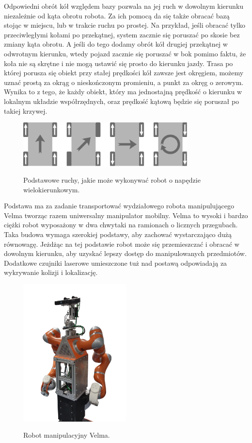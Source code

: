 Odpowiedni obrót kół względem bazy pozwala na jej ruch w dowolnym kierunku niezależnie od kąta obrotu robota.
Za ich pomocą da się także obracać bazą stojąc w miejscu, lub w trakcie ruchu po prostej.
Na przykład, jeśli obracać tylko przeciwległymi kołami po przekątnej, system zacznie się poruszać po skosie bez zmiany kąta obrotu.
A jeśli do tego dodamy obrót kół drugiej przekątnej w odwrotnym kierunku, wtedy pojazd zacznie się poruszać w bok pomimo faktu, że koła nie są skrętne i nie mogą ustawić się prosto do kierunku jazdy.
Trasa po której porusza się obiekt przy stałej prędkości kół zawsze jest okręgiem, możemy uznać prostą za okrąg o nieskończonym promieniu, a punkt za okręg o zerowym.
Wynika to z tego, że każdy obiekt, który ma jednostajną prędkość o kierunku w lokalnym układzie współrzędnych, oraz prędkość kątową będzie się poruszał po takiej krzywej.

\begin{figure}[H]
\centering
 \includegraphics[width=0.8\textwidth]{graphics/mecanum_dirs.pdf}
\label{graphics:mecanum_dirs}
\caption{Podstawowe ruchy, jakie może wykonywać robot o napędzie wielokierunkowym.}
\end{figure} 

Podstawa ma za zadanie transportować wydziałowego robota manipulującego Velma tworząc razem uniwersalny manipulator mobilny.
Velma to wysoki i bardzo ciężki robot wyposażony w dwa chwytaki na ramionach o licznych przegubach.
Taka budowa wymaga szerokiej podstawy, aby zachować wystarczająco dużą równowagę.
Jeżdżąc na tej podstawie robot może się przemieszczać i obracać w dowolnym kierunku, aby uzyskać lepszy dostęp do manipulowanych przedmiotów.
Dodatkowe czujniki laserowe umieszczone tuż nad postawą odpowiadają za wykrywanie kolizji i lokalizację.

\begin{figure}[H]
\centering
 \includegraphics[width=0.5\textwidth]{graphics/velma.png}
\label{graphics:velma}
\caption{Robot manipulacyjny Velma.}
\end{figure} 

